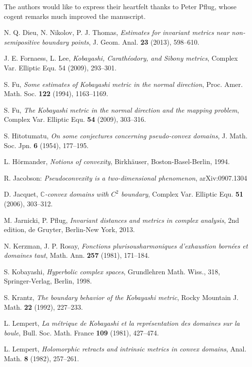 \documentclass[a4paper,12pt]{amsart}
\def\C{\mathbb C}
\begin{document}
 The authors would like to express their heartfelt thanks to Peter Pflug,
whose cogent remarks much improved the manuscript.

\begin{thebibliography}{}

 N. Q. Dieu, N. Nikolov, P. J. Thomas, {\it Estimates for invariant metrics near non-semipositive boundary points},
J. Geom. Anal. {\bf 23} (2013), 598--610.

 J. E. Fornaess, L. Lee, {\it Kobayashi, Carath\'eodory, and Sibony metrics},
Complex Var. Elliptic Equ. 54 (2009), 293--301.

 S. Fu, {\it Some estimates of Kobayashi metric in the normal direction}, Proc. Amer. Math. Soc. {\bf 122} (1994), 1163--1169.

 S. Fu, {\it The Kobayashi metric in the normal direction and the mapping problem}, Complex Var. Elliptic Equ. {\bf 54}
(2009), 303--316.

 S. Hitotumatu, {\it On some conjectures concerning pseudo-convex domains}, J. Math. Soc. Jpn. {\bf 6} (1954), 177--195.

 L. H\"ormander, {\it Notions of convexity}, Birkh\"auser, Boston-Basel-Berlin, 1994.

 R. Jacobson: {\it Pseudoconvexity is a two-dimensional phenomenon}, arXiv:0907.1304

 D. Jacquet, {\it $\C$-convex domains with $C^2$ boundary}, Complex Var. Elliptic Equ. {\bf 51} (2006), 303--312.

 M. Jarnicki, P. Pflug,
{\it Invariant distances and metrics in complex analysis}, 2nd edition, de Gruyter, Berlin-New York, 2013.

 N. Kerzman, J. P. Rosay, {\it Fonctions plurisousharmoniques d'exhaustion born\'ees et domaines taut},
 Math. Ann. {\bf 257} (1981), 171--184.

 S. Kobayashi, {\it Hyperbolic complex spaces},
Grundlehren Math. Wiss., 318, Springer-Verlag, Berlin, 1998.

 S. Krantz, {\it The boundary behavior of the Kobayashi metric}, Rocky Mountain J. Math. {\bf 22} (1992), 227--233.

 L. Lempert, {\it La m\'etrique de Kobayashi et la repr\'esentation des domaines sur la boule},
Bull. Soc. Math. France {\bf 109} (1981), 427--474.

 L. Lempert, {\it Holomorphic retracts and intrinsic metrics in convex domains},
Anal. Math. {\bf 8} (1982), 257--261.


\end{thebibliography}
\end{document}
